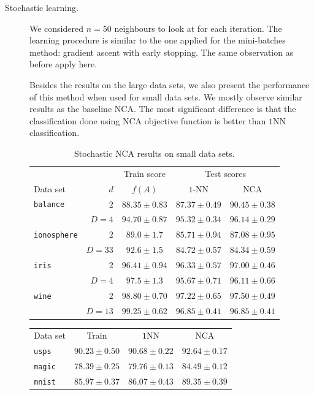 \begin{description}
{  }
  \item[Stochastic learning.] {
    We considered $n=50$ neighbours to look at for each iteration. The learning procedure is similar to the one applied for the mini-batches method: gradient ascent with early stopping. The same observation as before apply here. 

    Besides the results on the large data sets, we also present the performance of this method when used for small data sets. We mostly observe similar results as the baseline NCA. The most significant difference is that the classification done using NCA objective function is better than $1$NN classification.

    \begin{table}
      \centering\begin{tabular}{lrccc}
      \toprule
	      &     & Train score  & \multicolumn{2}{c}{Test scores}\\
      \cmidrule(r){3-3} \cmidrule(r){4-5}
      Data set & $d$ & $f(A)$ & $1$-NN & NCA \\
      \midrule
	\texttt{balance}&$2$&$88.35 \pm 0.83$&$87.37 \pm 0.49$&$90.45 \pm 0.38$\\  
	&$D=4$&$94.70 \pm 0.87$&$95.32 \pm 0.34$&$96.14 \pm 0.29$\\ 
	\midrule
	\texttt{ionosphere}&$2$&$89.0 \pm 1.7$&$85.71 \pm 0.94$&$87.08 \pm 0.95$\\
	&$D=33$&$92.6 \pm 1.5$&$84.72 \pm 0.57$&$84.34 \pm 0.59$\\ 
	\midrule
	\texttt{iris}&$2$&$96.41 \pm 0.94$&$96.33 \pm 0.57$&$97.00 \pm 0.46$\\ 
	&$D=4$&$97.5 \pm 1.3$&$95.67 \pm 0.71$&$96.11 \pm 0.66$\\ 
	\midrule
	\texttt{wine}&$2$&$98.80 \pm 0.70$&$97.22 \pm 0.65$&$97.50 \pm 0.49$\\ 
	&$D=13$&$99.25 \pm 0.62$&$96.85 \pm 0.41$&$96.85 \pm 0.41$\\ 
      \bottomrule
      \end{tabular}
      \caption{\small Stochastic NCA results on small data sets.}
    \end{table}
        \begin{table}
            	\centering
            	\begin{tabular}{lccc}
            	\toprule
            	Data set & Train & $1$NN & NCA \\
            	\cmidrule(r){2-2}\cmidrule(r){3-3}\cmidrule(r){4-4} 
            	\texttt{usps}&$90.23  \pm 0.50$&$90.68 \pm 0.22$&$92.64 \pm 0.17$\\
            	\texttt{magic}&$78.39 \pm 0.25$&$79.76 \pm 0.13$&$84.49 \pm 0.12$\\
            	\texttt{mnist}&$85.97 \pm 0.37$&$86.07 \pm 0.43$&$89.35 \pm 0.39$\\
            	
            	 \bottomrule
            	\end{tabular}
        \end{table}
    }
\end{description}
